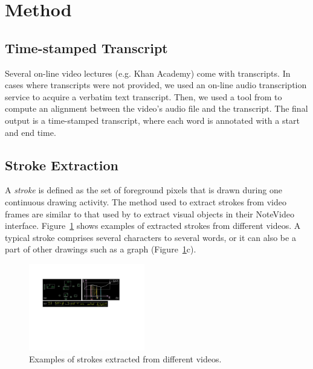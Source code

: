 \section{Method}
\subsection{Time-stamped Transcript}
Several on-line video lectures (e.g. Khan Academy) come with transcripts. In cases where transcripts were not provided, we used an on-line audio transcription service to acquire a verbatim text transcript. Then, we used a tool from \cite{rubin2013content} to compute an alignment between the video's audio file and the transcript. The final output is a time-stamped transcript, where each word is annotated with a start and end time.

\subsection{Stroke Extraction}
A \textit{stroke} is defined as the set of foreground pixels that is drawn during one continuous drawing activity. The method used to extract strokes from video frames are similar to that used by \cite{monserrat2013notevideo} to extract visual objects in their NoteVideo interface. Figure~\ref{Fig:stroke_examples} shows examples of extracted strokes from different videos. A typical stroke comprises several characters to several words, or it can also be a part of other drawings such as a graph (Figure~\ref{Fig:stroke_examples}c).  

\begin{figure}[h]
       \centering
        \includegraphics[width=0.45\textwidth, clip=true]{images/example_strokes}
        \caption{Examples of strokes extracted from different videos.}
        \label{Fig:stroke_examples}
\end{figure}

